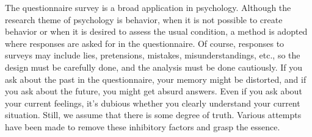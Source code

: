 \documentclass{ltjsbook}
\begin{document}
The questionnaire survey is a broad application in psychology. Although the research theme of psychology is behavior, when it is not possible to create behavior or when it is desired to assess the usual condition, a method is adopted where responses are asked for in the questionnaire. Of course, responses to surveys may include lies, pretensions, mistakes, misunderstandings, etc., so the design must be carefully done, and the analysis must be done cautiously. If you ask about the past in the questionnaire, your memory might be distorted, and if you ask about the future, you might get absurd answers. Even if you ask about your current feelings, it's dubious whether you clearly understand your current situation. Still, we assume that there is some degree of truth. Various attempts have been made to remove these inhibitory factors and grasp the essence.
\end{document}
